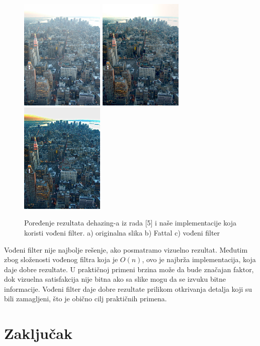 \documentclass[a4paper,12pt,titlepage]{article}
\begin{document}
\begin{figure}[ht!]
\centering
\includegraphics[width=40mm]{img/grad.jpg}
\includegraphics[width=40mm]{img/gradFattal.jpg}
\includegraphics[width=40mm]{img/gradDe.png}
\caption{Poređenje rezultata dehazing-a iz rada [5] i naše implementacije koja koristi vođeni filter. a) originalna slika b) Fattal c) vođeni filter}
\label{grad}
\end{figure} 

Vođeni filter nije najbolje rešenje, ako posmatramo vizuelno rezultat. Međutim zbog složenosti vođenog filtra koja je $O(n)$, ovo je najbrža implementacija, koja daje dobre rezultate. U praktičnoj primeni brzina može da bude značajan faktor, dok vizuelna satisfakcija nije bitna ako sa slike mogu da se izvuku bitne informacije. Vođeni filter daje dobre rezultate prilikom otkrivanja detalja koji su bili zamagljeni, što je obično cilj praktičnih primena.

\section{Zaključak}%
\end{document}
